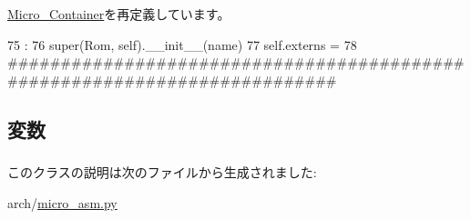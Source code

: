 \hyperlink{classmicro__asm_1_1Micro__Container_ac775ee34451fdfa742b318538164070e}{Micro\_\-Container}を再定義しています。


\begin{DoxyCode}
75                             :
76         super(Rom, self).__init__(name)
77         self.externs = {}
78 
##########################################################################
\end{DoxyCode}


\subsection{変数}
\hypertarget{classmicro__asm_1_1Rom_a60da89404fb9e6497fca0a251b534823}{
\subsubsection[{externs}]{}}
\label{classmicro__asm_1_1Rom_a60da89404fb9e6497fca0a251b534823}


このクラスの説明は次のファイルから生成されました:\begin{DoxyCompactItemize}
\item 
arch/\hyperlink{micro__asm_8py}{micro\_\-asm.py}\end{DoxyCompactItemize}

